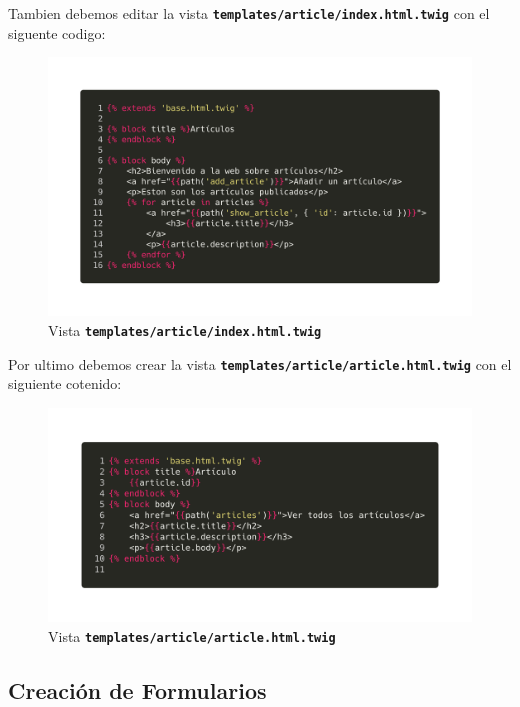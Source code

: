 Tambien debemos editar la vista \texttt{\textbf{templates/article/index.html.twig}} con el siguente codigo:

\begin{figure}[ht]
  \centering
  \includegraphics[width=\textwidth]{../assets/article_index_twig.png}
  \caption{Vista \texttt{\textbf{templates/article/index.html.twig}}}
  \label{fig:article_index_twig}
\end{figure}

\clearpage
Por ultimo debemos crear la vista \texttt{\textbf{templates/article/article.html.twig}} con el siguiente cotenido:

\begin{figure}[ht]
  \centering
  \includegraphics[width=\textwidth]{../assets/article_article.png}
  \caption{Vista \texttt{\textbf{templates/article/article.html.twig}}}
  \label{fig:article_article}
\end{figure}

\subsection{Creación de Formularios}

